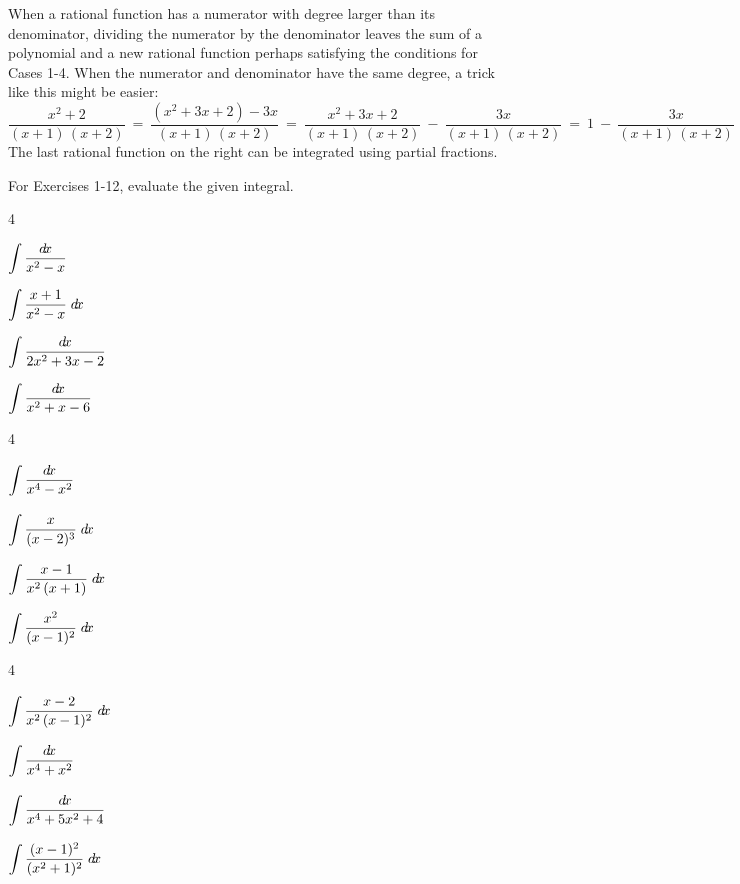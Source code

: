 When a rational function has a numerator with degree larger than its
denominator, dividing the numerator by the denominator leaves the sum of a
polynomial and a new rational function perhaps satisfying the conditions for
Cases 1-4. When the numerator and denominator have the same degree, a trick like
this might be easier:
\[
\frac{x^2 + 2}{(x+1)\,(x+2)} ~=~ \frac{(x^2 + 3x + 2) - 3x}{(x+1)\,(x+2)}
~=~ \frac{x^2 + 3x + 2}{(x+1)\,(x+2)} ~-~ \frac{3x}{(x+1)\,(x+2)}
~=~ 1 ~-~ \frac{3x}{(x+1)\,(x+2)}
\]
The last rational function on the right can be integrated using partial
fractions.
\newpage
\startexercises\label{sec6dot4}
{\small
{}
\par\noindent For Exercises 1-12, evaluate the given integral.
\begin{enumerate}[\bfseries 1.]
\begin{multicols}{4}
 \item $\displaystyle\int \frac{d\!x}{x^2 - x}$
 \item $\displaystyle\int \frac{x+1}{x^2 - x}\;d\!x$
 \item $\displaystyle\int \frac{d\!x}{2x^2 + 3x - 2}$
 \item $\displaystyle\int \frac{d\!x}{x^2 + x - 6}$
\end{multicols}
\begin{multicols}{4}
 \item $\displaystyle\int \frac{\dx}{x^4 - x^2}\vphantom{\displaystyle\int \frac{x^2}{(x-1)^2}}$
 \item $\displaystyle\int \frac{x}{(x - 2)^3}\;\dx\vphantom{\displaystyle\int \frac{x^2}{(x-1)^2}}$
 \item $\displaystyle\int \frac{x-1}{x^2\,(x+1)}\;\dx\vphantom{\displaystyle\int \frac{x^2}{(x-1)^2}}$
 \item $\displaystyle\int \frac{x^2}{(x-1)^2}\;d\!x$
\end{multicols}
\begin{multicols}{4}
 \item $\displaystyle\int \frac{x-2}{x^2\,(x-1)^2}\;\dx\vphantom{\displaystyle\int \frac{(x-1)^2}{(x^2 + 1)^2}}$
 \item $\displaystyle\int \frac{\dx}{x^4 + x^2}\vphantom{\displaystyle\int \frac{(x-1)^2}{(x^2 + 1)^2}}$
 \item $\displaystyle\int \frac{\dx}{x^4 + 5x^2 + 4}\vphantom{\displaystyle\int \frac{(x-1)^2}{(x^2 + 1)^2}}$
 \item $\displaystyle\int \frac{(x-1)^2}{(x^2 + 1)^2}\;d\!x$
\end{multicols}

\end{enumerate}}
